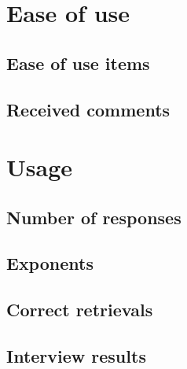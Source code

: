 \section{Ease of use}

\subsection{Ease of use items}

\subsection{Received comments}

\section{Usage}

\subsection{Number of responses}

\subsection{Exponents}

\subsection{Correct retrievals}

\subsection{Interview results}
